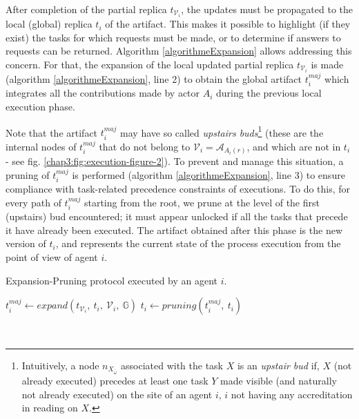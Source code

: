 After completion of the partial replica $t_{\mathcal{V}_{i}}$, the updates must be propagated to the local (global) replica $t_i$ of the artifact. This makes it possible to highlight (if they exist) the tasks for which requests must be made, or to determine if answers to requests can be returned.
Algorithm \ref{algorithmeExpansion} allows addressing this concern. For that, the expansion of the local updated partial replica $t_{\mathcal{V}_{i}}$ is made (algorithm \ref{algorithmeExpansion}, line 2) to obtain the global artifact $t^{maj}_i$ which integrates all the contributions made by actor $A_i$ during the previous local execution phase.

Note that the artifact $t^{maj}_i$ may have so called \textit{upstairs buds}\footnote{Intuitively, a node ${n_{X_{\bar{\omega}}}}$ associated with the task $X$ is an \textit{upstair bud} if, $X$ (not already executed) precedes at least one task $Y$ made visible (and naturally not already executed) on the site of an agent $i$, $i$ not having any accreditation in reading on $X$.} (these are the internal nodes of $t^{maj}_i$ that do not belong to $\mathcal{V}_{i}=\mathcal{A}_{A_i (r)}$, and which are not in $t_i$ - see fig. \ref{chap3:fig:execution-figure-2}). 
To prevent and manage this situation, a pruning of $t^{maj}_i$ is performed (algorithm \ref{algorithmeExpansion}, line 3) to ensure compliance with task-related precedence constraints of executions. 
To do this, for every path of $t^{maj}_i$ starting from the root, we prune at the level of the first (upstairs) bud encountered; it must appear unlocked if all the tasks that precede it have already been executed. The artifact obtained after this phase is the new version of $t_i$, and represents the current state of the process execution from the point of view of agent $i$. 

\begin{algorithm}
\small
\caption{Expansion-Pruning protocol executed by an agent $i$.\label{algorithmeExpansion}}
\begin{algorithmic}[1]
		\State $t^{maj}_i \gets expand(t_{\mathcal{V}_{i}}, ~t_i, ~\mathcal{V}_{i}, ~\mathbb{G})$
		\State $t_{i} \gets pruning(t^{maj}_i, ~t_i)$%
	\EndProcedure
\end{algorithmic}
\end{algorithm}

~

